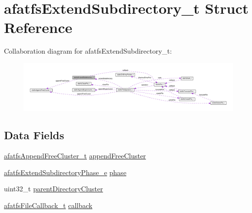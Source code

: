 \hypertarget{structafatfsExtendSubdirectory__t}{\section{afatfs\+Extend\+Subdirectory\+\_\+t Struct Reference}
\label{structafatfsExtendSubdirectory__t}
}


Collaboration diagram for afatfs\+Extend\+Subdirectory\+\_\+t\+:\nopagebreak
\begin{figure}[H]
\begin{center}
\leavevmode
\includegraphics[width=350pt]{structafatfsExtendSubdirectory__t__coll__graph}
\end{center}
\end{figure}
\subsection*{Data Fields}
\begin{DoxyCompactItemize}
\item 
\hyperlink{structafatfsAppendFreeCluster__t}{afatfs\+Append\+Free\+Cluster\+\_\+t} \hyperlink{structafatfsExtendSubdirectory__t_a341f3eac0ad09d79447faf699861ff02}{append\+Free\+Cluster}
\item 
\hyperlink{asyncfatfs_8c_a9e5e306373bbf35be6a3ce70a69000e2}{afatfs\+Extend\+Subdirectory\+Phase\+\_\+e} \hyperlink{structafatfsExtendSubdirectory__t_a8671ce558b40b5efc2ebb345a95d08d9}{phase}
\item 
uint32\+\_\+t \hyperlink{structafatfsExtendSubdirectory__t_ad7cf8ed318a8eedd591b0d49afe2a6a5}{parent\+Directory\+Cluster}
\item 
\hyperlink{asyncfatfs_8h_aaa910b9db73f482a20cfa5a7f3970e7f}{afatfs\+File\+Callback\+\_\+t} \hyperlink{structafatfsExtendSubdirectory__t_a3d82ed2665c3aa6c4aeac9cf4ae21e87}{callback}
\end{DoxyCompactItemize}


